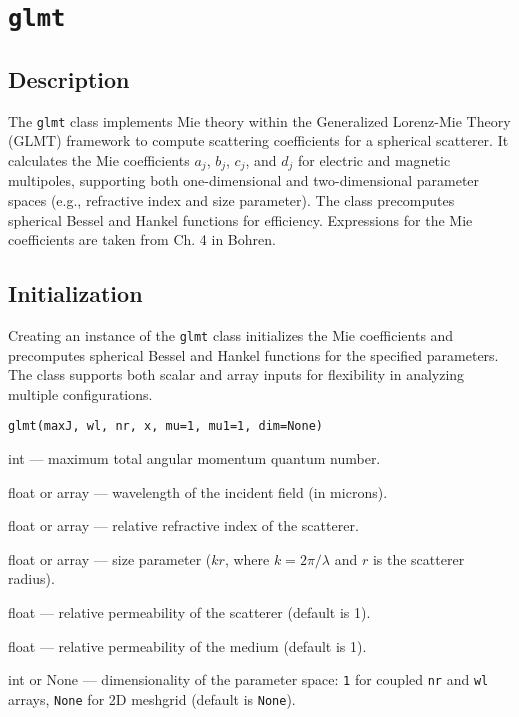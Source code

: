 \section{\texttt{glmt}}

\subsection{Description}
The \texttt{glmt} class implements Mie theory within the Generalized Lorenz-Mie Theory (GLMT) framework to compute scattering coefficients for a spherical scatterer. It calculates the Mie coefficients \( a_j \), \( b_j \), \( c_j \), and \( d_j \) for electric and magnetic multipoles, supporting both one-dimensional and two-dimensional parameter spaces (e.g., refractive index and size parameter). The class precomputes spherical Bessel and Hankel functions for efficiency. Expressions for the Mie coefficients are taken from Ch. 4 in Bohren\cite{bohren}.

\subsection{Initialization}
Creating an instance of the \texttt{glmt} class initializes the Mie coefficients and precomputes spherical Bessel and Hankel functions for the specified parameters. The class supports both scalar and array inputs for flexibility in analyzing multiple configurations.

\begin{verbatim}
glmt(maxJ, wl, nr, x, mu=1, mu1=1, dim=None)
\end{verbatim}

\begin{description}[leftmargin=3cm]
    \item[\texttt{maxJ:}] int — maximum total angular momentum quantum number.
    \item[\texttt{wl:}] float or array — wavelength of the incident field (in microns).
    \item[\texttt{nr:}] float or array — relative refractive index of the scatterer.
    \item[\texttt{x:}] float or array — size parameter (\( k r \), where \( k = 2\pi / \lambda \) and \( r \) is the scatterer radius).
    \item[\texttt{mu:}] float — relative permeability of the scatterer (default is 1).
    \item[\texttt{mu1:}] float — relative permeability of the medium (default is 1).
    \item[\texttt{dim:}] int or None — dimensionality of the parameter space: \texttt{1} for coupled \texttt{nr} and \texttt{wl} arrays, \texttt{None} for 2D meshgrid (default is \texttt{None}).
\end{description}


